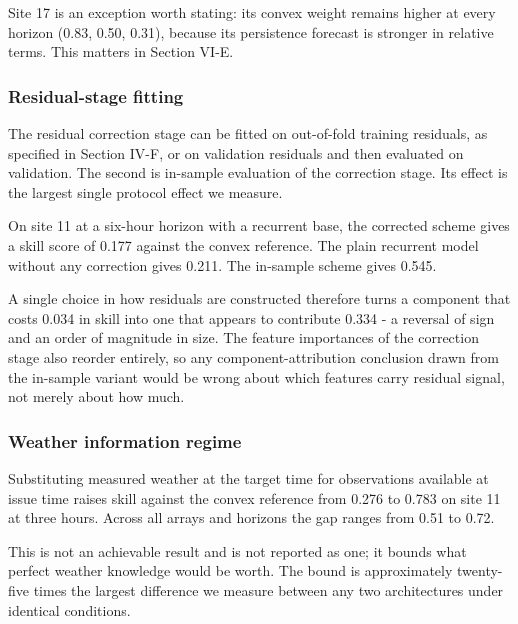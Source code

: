 Site 17 is an exception worth stating: its convex weight remains higher
at every horizon (0.83, 0.50, 0.31), because its persistence forecast is
stronger in relative terms. This matters in Section VI-E.

\subsubsection{Residual-stage fitting}

The residual correction stage can be fitted on out-of-fold training
residuals, as specified in Section IV-F, or on validation residuals and
then evaluated on validation. The second is in-sample evaluation of the
correction stage. Its effect is the largest single protocol effect we
measure.

On site 11 at a six-hour horizon with a recurrent base, the corrected
scheme gives a skill score of 0.177 against the convex reference. The
plain recurrent model without any correction gives 0.211. The in-sample
scheme gives 0.545.

A single choice in how residuals are constructed therefore turns a
component that costs 0.034 in skill into one that appears to contribute
0.334 - a reversal of sign and an order of magnitude in size. The
feature importances of the correction stage also reorder entirely, so
any component-attribution conclusion drawn from the in-sample variant
would be wrong about which features carry residual signal, not merely
about how much.

\subsubsection{Weather information regime}

Substituting measured weather at the target time for observations
available at issue time raises skill against the convex reference from
0.276 to 0.783 on site 11 at three hours. Across all arrays and
horizons the gap ranges from 0.51 to 0.72.

This is not an achievable result and is not reported as one; it bounds
what perfect weather knowledge would be worth. The bound is
approximately twenty-five times the largest difference we measure
between any two architectures under identical conditions.


